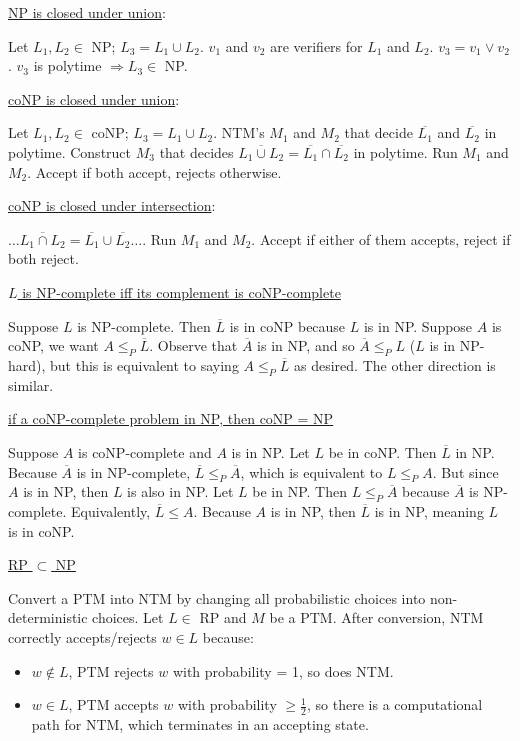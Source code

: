 \documentclass[10pt,landscape,a4paper]{article}
\begin{document}
\begin{multicols*}{3}
\underline{NP is closed under union}:

Let $L_1, L_2 \in$ NP; $L_3 = L_1 \cup L_2$. $v_1$ and $v_2$ are verifiers for $L_1$ and $L_2$. $v_3 = v_1 \vee v_2$. $v_3$ is polytime $\Rightarrow L_3 \in$ NP.

\underline{coNP is closed under union}:

Let $L_1, L_2 \in$ coNP; $L_3 = L_1 \cup L_2$. NTM's $M_1$ and $M_2$ that decide $\overline{L_1}$ and $\overline{L_2}$ in polytime. Construct $M_3$ that decides $\overline{L_1 \cup L_2} = \overline{L_1} \cap \overline{L_2}$ in polytime. Run $M_1$ and $M_2$. Accept if both accept, rejects otherwise.

\underline{coNP is closed under intersection}:

$\ldots \overline{L_1 \cap L_2} = \overline{L_1} \cup \overline{L_2} \ldots$. Run $M_1$ and $M_2$. Accept if either of them accepts, reject if both reject.

\underline{$L$ is NP-complete iff its complement is coNP-complete}

Suppose $L$ is NP-complete. Then $\overline{L}$ is in coNP because $L$ is in NP. Suppose $A$ is coNP, we want $A \leq_P \overline{L}$. Observe that $\overline{A}$ is in NP, and so $\overline{A} \leq_P L$ ($L$ is in NP-hard), but this is equivalent to saying $A \leq_P \overline{L}$ as desired. The other direction is similar.

\underline{if a coNP-complete problem in NP, then coNP = NP}

Suppose $A$ is coNP-complete and $A$ is in NP. Let $L$ be in coNP. Then $\overline{L}$ in NP. Because $\overline{A}$ is in NP-complete, $\overline{L} \leq_P \overline{A}$, which is equivalent to $L \leq_P A$. But since $A$ is in NP, then $L$ is also in NP. Let $L$ be in NP. Then $L \leq_P \overline{A}$ because $\overline{A}$ is NP-complete. Equivalently, $\overline{L} \leq A$. Because $A$ is in NP, then $\overline{L}$ is in NP, meaning $L$ is in coNP.

\underline{RP $\subset$ NP}

Convert a PTM into NTM by changing all probabilistic choices into non-deterministic choices. Let $L \in$ RP and $M$ be a PTM. After conversion, NTM correctly accepts/rejects $w \in L$ because:

\begin{itemize}
    \item $w \notin L$, PTM rejects $w$ with probability = 1, so does NTM.
    \item $w \in L$, PTM accepts $w$ with probability $\geq \frac{1}{2}$, so there is a computational path for NTM, which terminates in an accepting state.
\end{itemize}


\end{multicols*}
\end{document}
